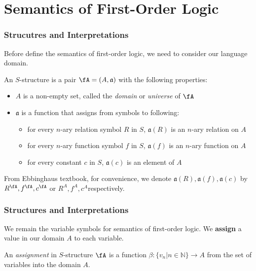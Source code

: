 \section{Semantics of First-Order Logic}

\begin{frame}
    \frametitle{Strucutres and Interpretations}

    Before define the semantics of first-order logic, we need to consider our language domain.

    \begin{definition}
        An $S$-structure is a pair $\fA = (A, \mathfrak{a})$ with the following properties:
        \begin{itemize}
            \item $A$ is a non-empty set, called the \emph{domain} or \emph{universe} of $\fA$
            \item $\mathfrak{a}$ is a function that assigns from symbols to following:
            \begin{itemize}
                \item for every $n$-ary relation symbol $R$ in $S$, $\mathfrak{a}(R)$ is an $n$-ary relation on $A$
                \item for every $n$-ary function symbol $f$ in $S$, $\mathfrak{a}(f)$ is an $n$-ary function on $A$
                \item for every constant $c$ in $S$, $\mathfrak{a}(c)$ is an element of $A$
            \end{itemize}
        \end{itemize}
    \end{definition}

    From Ebbinghaus textbook, for convenience, we denote $\mathfrak{a}(R), \mathfrak{a}(f), \mathfrak{a}(c)$ by $R^{\fA}, f^{\fA}, c^{\fA}$ or $R^A, f^A, c^A$respectively.
\end{frame}

\begin{frame}
    \frametitle{Structures and Interpretations}

    We remain the variable symbols for semantics of first-order logic.
    We \textbf{assign} a value in our domain $A$ to each variable.

    \begin{definition}
        An \emph{assignment} in $S$-structure $\fA$ is a function $\beta:\{v_n|n \in \mathbb{N}\} \to A$ from the set of variables into the domain $A$.
    \end{definition}
\end{frame}

